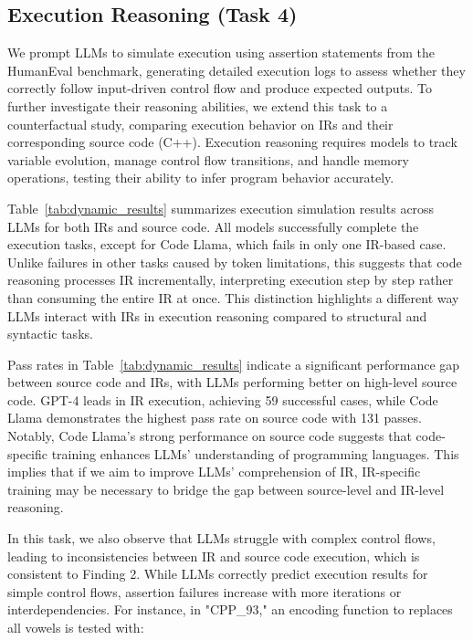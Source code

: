 \subsection{Execution Reasoning (Task 4)}
\label{subsec:execution_reasoning}



We prompt LLMs to simulate execution using assertion statements from the HumanEval benchmark, generating detailed execution logs to assess whether they correctly follow input-driven control flow and produce expected outputs. To further investigate their reasoning abilities, we extend this task to a counterfactual study, comparing execution behavior on IRs and their corresponding source code (C++). Execution reasoning requires models to track variable evolution, manage control flow transitions, and handle memory operations, testing their ability to infer program behavior accurately.

Table~\ref{tab:dynamic_results} summarizes execution simulation results across LLMs for both IRs and source code.
All models successfully complete the execution tasks, except for Code Llama, which fails in only one IR-based case. Unlike failures in other tasks caused by token limitations, this suggests that code reasoning processes IR incrementally, interpreting execution step by step rather than consuming the entire IR at once. This distinction highlights a different way LLMs interact with IRs in execution reasoning compared to structural and syntactic tasks.

Pass rates in Table~\ref{tab:dynamic_results} indicate a significant performance gap between source code and IRs, with LLMs performing better on high-level source code. GPT-4 leads in IR execution, achieving 59 successful cases, while Code Llama demonstrates the highest pass rate on source code with 131 passes.
Notably, Code Llama’s strong performance on source code suggests that code-specific training enhances LLMs' understanding of programming languages. This implies that if we aim to improve LLMs' comprehension of IR, IR-specific training may be necessary to bridge the gap between source-level and IR-level reasoning.

In this task, we also observe that LLMs struggle with complex control flows, leading to inconsistencies between IR and source code execution, which is consistent to Finding 2. While LLMs correctly predict execution results for simple control flows, assertion failures increase with more iterations or interdependencies. For instance, in "CPP\_93," an encoding function to replaces all vowels is tested with:

